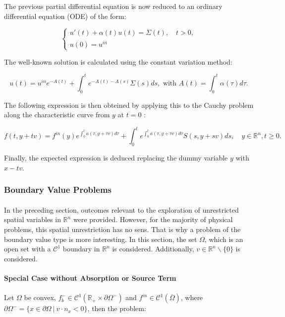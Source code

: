 \documentclass[a4paper, 11pt]{article}
\begin{document}
The previous partial differential equation is now reduced to an ordinary differential equation (ODE) of the form:

\[
\begin{cases}
u'(t)+\alpha(t)u(t)=\Sigma(t), \quad t>0,\\
u(0)=u^{in}
\end{cases}
\]

The well-known solution is calculated using the constant variation method:

\[ u(t) = u^{in} e^{-A(t)} + \int_{0}^{t} e^{-A(t)-A(s)}\Sigma(s)ds, \text{ with } A(t)=\int_{0}^{t} \alpha (\tau) d\tau. \]

The following expression is then obteined by applying this to the Cauchy problem along the characteristic curve from $y$ at $t=0$ :

\begin{equation}
f(t,y+tv) = f^{in}(y) e^{\int_{0}^{t}a(\tau,y+\tau v)d\tau} + \int_{0}^{t} e^{\int_{0}^{t}a(\tau,y+\tau v)d\tau}S(s,y+sv)ds, \quad y\in \mathbb{R}^n, t \geq 0.
\end{equation}

Finally, the expected expression is deduced replacing the dummy variable $y$ with $x-tv$.

\subsubsection{Boundary Value Problems}

\paragraph{}
In the preceding section, outcomes relevant to the exploration of unrestricted spatial variables in $\mathbb{R}^n$ were provided. However, for the majority of physical problems, this spatial unrestriction has no sens. That is why a problem of the boundary value type is more interesting. In this section, the set $\Omega$, which is an open set with a $\mathcal{C}^1$ boundary in $\mathbb{R}^n$ is considered. Additionally, $v \in \mathbb{R}^n\backslash \{0\}$ is considered.

\paragraph{Special Case without Absorption or Source Term}

\paragraph{}
Let $\Omega$ be convex, $f_b^- \in \mathcal{C}^1(\mathbb{R}_+ \times \partial \Omega^-)$ and $f^{in} \in \mathcal{C}^1(\overline{\Omega})$, where $\partial \Omega^- = \{x\in\partial \Omega~ | ~ v\cdot n_x<0\}$, then the problem:
\end{document}
